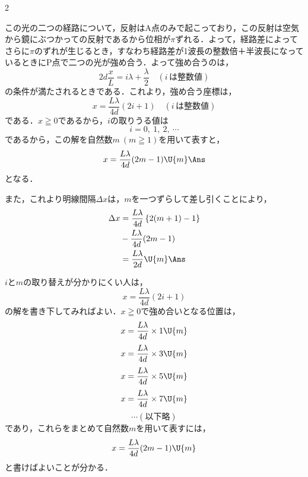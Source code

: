 \begin{multicols}{2}
\begin{komon}
 この光の二つの経路について，反射は$\mathrm{A}$点のみで起こっており，この反射は空気から鏡にぶつかっての反射であるから位相が$\pi$ずれる．よって，経路差によってさらに$\pi$のずれが生じるとき，すなわち経路差が1波長の整数倍＋半波長になっているときに$\mathrm{P}$点で二つの光が強め合う．よって強め合うのは，
       \[2d\frac{x}{L}=i\lambda+\frac{\lambda}{2}\quad(i\,は整数値)\]
       の条件が満たされるときである．これより，強め合う座標は，
       \[x=\frac{L\lambda}{4d}(2i+1)\quad(i\,は整数値)\]
       である．$x\geqq 0$であるから，$i$の取りうる値は
       \[i=0,\ 1,\ 2,\ \cdots\]
       であるから，この解を自然数$m\ (m\geqq 1)$を用いて表すと，
       \[x=\frac{L\lambda}{4d}(2m-1)\U{m}\Ans\]
       となる．

       \hspace{1zw}また，これより明線間隔$\Delta x$は，$m$を一つずらして差し引くことにより，
       \[\begin{aligned}
         \Delta x&=\frac{L\lambda}{4d}\left\{2(m+1)-1\right\}\\
                 &\hspace*{\fill}-\frac{L\lambda}{4d}(2m-1)\\
                 &=\frac{L\lambda}{2d}\U{m}\Ans
       \end{aligned}\]
       \begin{chuu}
       $i$と$m$の取り替えが分かりにくい人は，
       \[x=\frac{L\lambda}{4d}(2i+1)\]
       の解を書き下してみればよい．$x\geqq 0$で強め合いとなる位置は，
       \[x=\frac{L\lambda}{4d}\times 1\U{m}\]
       \[x=\frac{L\lambda}{4d}\times 3\U{m}\]
       \[x=\frac{L\lambda}{4d}\times 5\U{m}\]
       \[x=\frac{L\lambda}{4d}\times 7\U{m}\]
       \[\cdots(以下略)\]
       であり，これらをまとめて自然数$m$を用いて表すには，
       \[x=\frac{L\lambda}{4d}(2m-1)\U{m}\]
       と書けばよいことが分かる．
       \end{chuu}
\end{komon}


\end{multicols}
